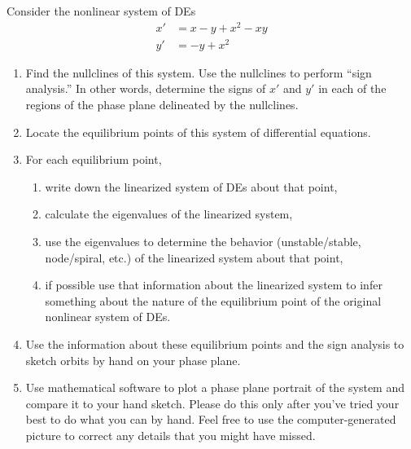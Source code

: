 \documentclass[12pt,letterpaper]{hmcpset}
\begin{document}

\begin{problem}[1]
    Consider the nonlinear system of DEs
    \begin{align*}
        x'&=x-y+x^2-xy\\
        y'&=-y+x^2
    \end{align*}
    \begin{enumerate}
        \item Find the nullclines of this system. Use the nullclines
            to perform ``sign analysis.'' In other words, determine the
            signs of $x'$ and $y'$ in each of the regions of the phase
            plane delineated by the nullclines.
        \item Locate the equilibrium points of this system of
            differential equations.
        \item For each equilibrium point,
        \begin{enumerate}[label=(\roman*)]
            \item write down the linearized system of DEs about that
                point,
            \item calculate the eigenvalues of the linearized system,
            \item use the eigenvalues to determine the behavior
                (unstable/stable, node/spiral, etc.) of the linearized
                system about that point,
            \item if possible use that information about the
                linearized system to infer something about the nature of
                the equilibrium point of the original nonlinear system
                of DEs.
        \end{enumerate}
        \item Use the information about these equilibrium points and
            the sign analysis to sketch orbits by hand on your phase
            plane.
        \item Use mathematical software to plot a phase plane portrait
            of the system and compare it to your hand sketch.  Please do
            this only after you've tried your best to do what you can by
            hand.  Feel free to use the computer-generated picture to
            correct any details that you might have missed.
    \end{enumerate}
\end{problem}
\newpage
\begin{solution}
    \null\vfill
\end{solution}
\newpage
\end{document}

